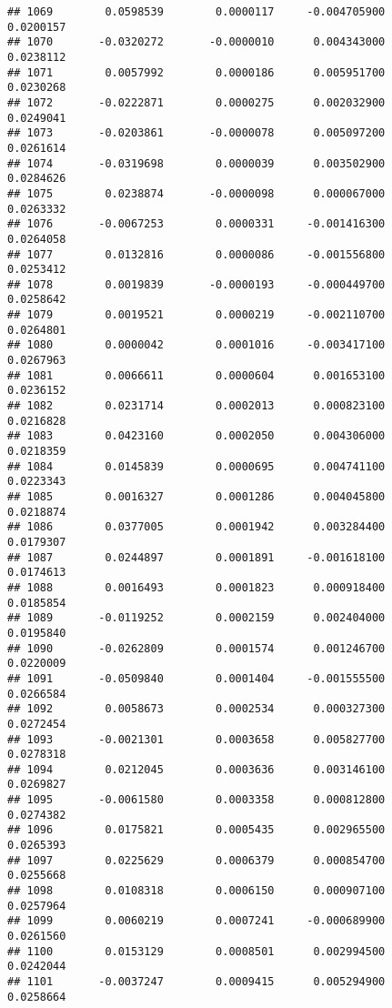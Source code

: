 \documentclass[
]{article}
\begin{document}
\begin{verbatim}
## 1069        0.0598539        0.0000117     -0.004705900             0.0200157
## 1070       -0.0320272       -0.0000010      0.004343000             0.0238112
## 1071        0.0057992        0.0000186      0.005951700             0.0230268
## 1072       -0.0222871        0.0000275      0.002032900             0.0249041
## 1073       -0.0203861       -0.0000078      0.005097200             0.0261614
## 1074       -0.0319698        0.0000039      0.003502900             0.0284626
## 1075        0.0238874       -0.0000098      0.000067000             0.0263332
## 1076       -0.0067253        0.0000331     -0.001416300             0.0264058
## 1077        0.0132816        0.0000086     -0.001556800             0.0253412
## 1078        0.0019839       -0.0000193     -0.000449700             0.0258642
## 1079        0.0019521        0.0000219     -0.002110700             0.0264801
## 1080        0.0000042        0.0001016     -0.003417100             0.0267963
## 1081        0.0066611        0.0000604      0.001653100             0.0236152
## 1082        0.0231714        0.0002013      0.000823100             0.0216828
## 1083        0.0423160        0.0002050      0.004306000             0.0218359
## 1084        0.0145839        0.0000695      0.004741100             0.0223343
## 1085        0.0016327        0.0001286      0.004045800             0.0218874
## 1086        0.0377005        0.0001942      0.003284400             0.0179307
## 1087        0.0244897        0.0001891     -0.001618100             0.0174613
## 1088        0.0016493        0.0001823      0.000918400             0.0185854
## 1089       -0.0119252        0.0002159      0.002404000             0.0195840
## 1090       -0.0262809        0.0001574      0.001246700             0.0220009
## 1091       -0.0509840        0.0001404     -0.001555500             0.0266584
## 1092        0.0058673        0.0002534      0.000327300             0.0272454
## 1093       -0.0021301        0.0003658      0.005827700             0.0278318
## 1094        0.0212045        0.0003636      0.003146100             0.0269827
## 1095       -0.0061580        0.0003358      0.000812800             0.0274382
## 1096        0.0175821        0.0005435      0.002965500             0.0265393
## 1097        0.0225629        0.0006379      0.000854700             0.0255668
## 1098        0.0108318        0.0006150      0.000907100             0.0257964
## 1099        0.0060219        0.0007241     -0.000689900             0.0261560
## 1100        0.0153129        0.0008501      0.002994500             0.0242044
## 1101       -0.0037247        0.0009415      0.005294900             0.0258664

\end{verbatim}
\end{document}
